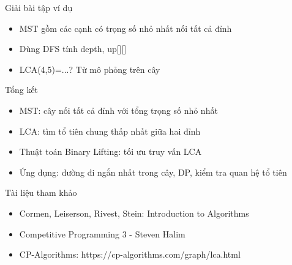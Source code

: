 \documentclass[aspectratio=169]{beamer}
\begin{document}
\begin{frame}{Giải bài tập ví dụ}
\begin{itemize}
    \item MST gồm các cạnh có trọng số nhỏ nhất nối tất cả đỉnh
    \item Dùng DFS tính depth, up[][]
    \item LCA(4,5)=...? Từ mô phỏng trên cây
\end{itemize}
\end{frame}

\begin{frame}{Tổng kết}
\begin{itemize}
    \item MST: cây nối tất cả đỉnh với tổng trọng số nhỏ nhất
    \item LCA: tìm tổ tiên chung thấp nhất giữa hai đỉnh
    \item Thuật toán Binary Lifting: tối ưu truy vấn LCA
    \item Ứng dụng: đường đi ngắn nhất trong cây, DP, kiểm tra quan hệ tổ tiên
\end{itemize}
\end{frame}

\begin{frame}{Tài liệu tham khảo}
\begin{itemize}
    \item Cormen, Leiserson, Rivest, Stein: Introduction to Algorithms
    \item Competitive Programming 3 - Steven Halim
    \item CP-Algorithms: https://cp-algorithms.com/graph/lca.html
\end{itemize}
\end{frame}
\end{document}
